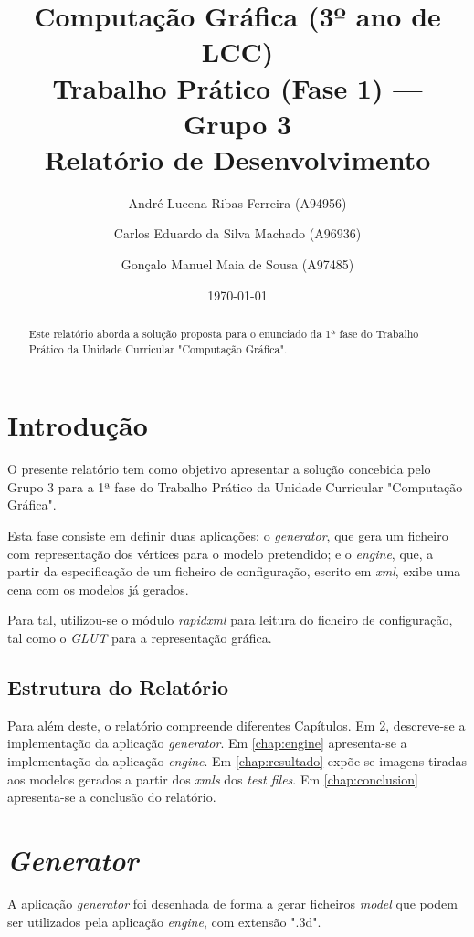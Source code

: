 \documentclass[14pt, a4 paper]{report}
\title{Computação Gráfica (3º ano de LCC)\\
       \textbf{Trabalho Prático (Fase 1) — Grupo 3}\\ Relatório de Desenvolvimento}
\author{André Lucena Ribas Ferreira (A94956) 
    \and Carlos Eduardo da Silva Machado (A96936)
    \and Gonçalo Manuel Maia de Sousa (A97485)}
\date{\today} %
\begin{document}
\maketitle

\begin{abstract}
    Este relatório aborda a solução proposta para o enunciado da 1ª fase do Trabalho Prático da Unidade Curricular "Computação Gráfica". 
\end{abstract}

\tableofcontents

\chapter{Introdução} \label{chap:intro}

O presente relatório tem como objetivo apresentar a solução concebida pelo Grupo 3 para a 1ª fase do Trabalho Prático da Unidade Curricular "Computação Gráfica". 

Esta fase consiste em definir duas aplicações: o \textit{generator}, que gera um ficheiro com representação dos vértices para o modelo pretendido; e o \textit{engine}, que, a partir da especificação de um ficheiro de configuração, escrito em \textit{xml}, exibe uma cena com os modelos já gerados.

Para tal, utilizou-se o módulo \textit{rapidxml} para leitura do ficheiro de configuração, tal como o \textit{GLUT} para a representação gráfica.

\section{Estrutura do Relatório}

Para além deste, o relatório compreende diferentes Capítulos. Em \ref{chap:generator}, descreve-se a implementação da aplicação \textit{generator}. Em \ref{chap:engine} apresenta-se a implementação da aplicação \textit{engine}. Em \ref{chap:resultado} expõe-se imagens tiradas aos modelos gerados a partir dos \textit{xmls} dos \textit{test files}.
Em \ref{chap:conclusion} apresenta-se a conclusão do relatório.

\chapter{\textit{Generator}} \label{chap:generator}
A aplicação \textit{generator} foi desenhada de forma a gerar ficheiros \textit{model} que podem ser utilizados pela aplicação \textit{engine}, com extensão ".3d".
\end{document}

